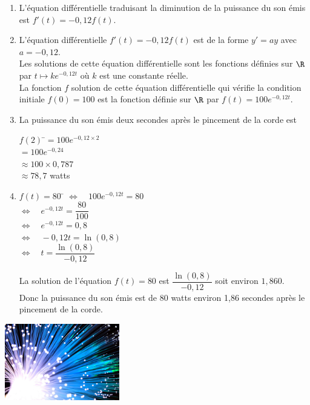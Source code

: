\documentclass[a4paper,11pt,exos]{nsi} %
\begin{document}
\textcolor{UGLiBlue}{
    \begin{enumerate}
        \item L'équation différentielle traduisant la diminution de la puissance du son émis est $f'(t)=-0,12f(t)$.
        \item L'équation différentielle $f'(t)=-0,12f(t)$ est de la forme $y'=ay$ avec $a=-0,12$.\\
        Les solutions de cette équation différentielle sont les fonctions définies sur $\R$ par $t\mapsto ke^{-0,12t}$ où $k$ est une constante réelle.\\
        La fonction $f$ solution de cette équation différentielle qui vérifie la condition initiale $f(0)=100$ est la fonction définie sur $\R$ par $f(t)=100e^{-0,12t}$.
        \item La puissance du son émis deux secondes après le pincement de la corde est 
        \begin{tabbing}
            $f(2)$ \=$=100e^{-0,12\times 2}$\\
            \> $=100e^{-0,24}$\\
            \> $\approx 100\times 0,787$\\
            \> $\approx 78,7$ watts
        \end{tabbing}
        \item \begin{tabbing}
            $f(t)=80$ \= $\iff \quad 100e^{-0,12t}=80$\\
            \> $\iff \quad e^{-0,12t}=\dfrac{80}{100}$\\
            \> $\iff \quad e^{-0,12t}=0,8$\\
            \> $\iff \quad -0,12t=\ln(0,8)$\\
            \> $\iff \quad t=\dfrac{\ln(0,8)}{-0,12}$
        \end{tabbing}
        La solution de l'équation $f(t)=80$ est $\dfrac{\ln(0,8)}{-0,12}$ soit environ $1,860$.\\[.5em]
        Donc la puissance du son émis est de 80 watts environ 1,86 secondes après le pincement de la corde.
    \end{enumerate}
}

\exo{}
{\includegraphics[width=5cm]{fiber-optic-2749588_1280.jpg}}
\vspace*{.2cm}
\end{document}
